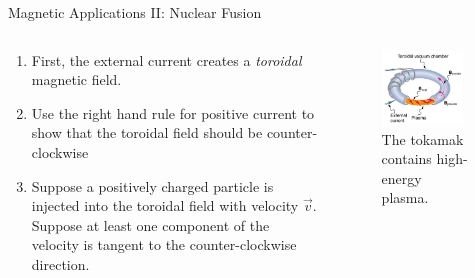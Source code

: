 \documentclass{beamer}
\begin{document}
\begin{frame}{Magnetic Applications II: Nuclear Fusion}
\small
\begin{columns}[T]
\begin{column}{0.5\textwidth}
\begin{enumerate}
\item First, the external current creates a \textit{toroidal} magnetic field.
\item Use the right hand rule for positive current to show that the toroidal field should be counter-clockwise
\item Suppose a positively charged particle is injected into the toroidal field with velocity $\vec{v}$.  Suppose at least one component of the velocity is tangent to the counter-clockwise direction.\end{enumerate}
\end{column}
\begin{column}{0.5\textwidth}
\begin{figure}
\centering
\includegraphics[width=0.9\textwidth]{figures/tokamak.png}
\caption{\label{fig:tokamak2} The tokamak contains high-energy plasma.}
\end{figure}
\end{column}
\end{columns}
\end{frame}
\end{document}
